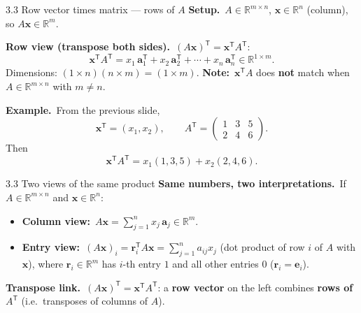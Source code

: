 \documentclass[11pt,aspectratio=169]{beamer}
\begin{document}
\begin{frame}{3.3 Row vector times matrix --- rows of $A$}
  \footnotesize
  \textbf{Setup.}\
  $A\in\mathbb{R}^{m\times n}$, $\mathbf{x}\in\mathbb{R}^n$ (column), so $A\mathbf{x}\in\mathbb{R}^m$.

  \medskip
  \textbf{Row view (transpose both sides).}\
  $(A\mathbf{x})^{\mathsf T}=\mathbf{x}^{\mathsf T}A^{\mathsf T}$:
  \[
    \mathbf{x}^{\mathsf T}A^{\mathsf T}
    = x_1\,\mathbf{a}_1^{\mathsf T}+x_2\,\mathbf{a}_2^{\mathsf T}+\cdots+x_n\,\mathbf{a}_n^{\mathsf T}
    \in\mathbb{R}^{1\times m}.
  \]
  Dimensions: $(1\times n)(n\times m)=(1\times m)$.
  \textbf{Note:}\ $\mathbf{x}^{\mathsf T}A$ does \textbf{not} match when $A\in\mathbb{R}^{m\times n}$ with $m\neq n$.

  \medskip
  \textbf{Example.}\
  From the previous slide,
  \[
    \mathbf{x}^{\mathsf T}=(x_1,x_2),
    \qquad
    A^{\mathsf T}=
    \begin{pmatrix}
      1&3&5\\
      2&4&6
    \end{pmatrix}.
  \]
  Then
  \[
    \mathbf{x}^{\mathsf T}A^{\mathsf T}
    = x_1(1,3,5)+x_2(2,4,6).
  \]
\end{frame}

\begin{frame}{3.3 Two views of the same product}
  \footnotesize
  \textbf{Same numbers, two interpretations.}\
  If $A\in\mathbb{R}^{m\times n}$ and $\mathbf{x}\in\mathbb{R}^n$:
  \begin{itemize}
    \item \textbf{Column view:}\ $A\mathbf{x}=\sum_{j=1}^n x_j\,\mathbf{a}_j\in\mathbb{R}^m$.
    \item \textbf{Entry view:}\ $(A\mathbf{x})_i=\mathbf{r}_i^{\mathsf T}A\mathbf{x}
      = \sum_{j=1}^n a_{ij}x_j$ (dot product of row $i$ of $A$ with $\mathbf{x}$),
      where $\mathbf{r}_i\in\mathbb{R}^m$ has $i$-th entry $1$ and all other entries $0$
      ($\mathbf{r}_i=\mathbf{e}_i$).
  \end{itemize}

  \medskip
  \textbf{Transpose link.}\
  $(A\mathbf{x})^{\mathsf T}=\mathbf{x}^{\mathsf T}A^{\mathsf T}$:
  a \textbf{row vector} on the left combines \textbf{rows of $A^{\mathsf T}$} (i.e.\ transposes of
  columns of $A$).
\end{frame}
\end{document}
